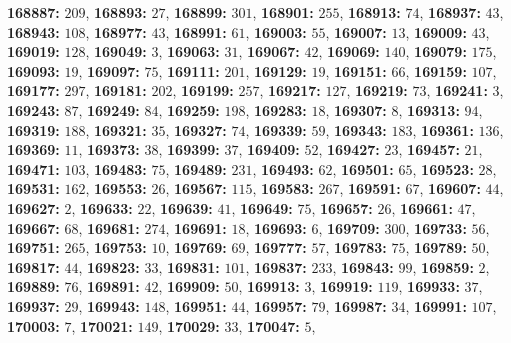 \textsf{\bfseries 168887:} $209$, \textsf{\bfseries 168893:} $27$, \textsf{\bfseries 168899:} $301$, \textsf{\bfseries 168901:} $255$, \textsf{\bfseries 168913:} $74$, \textsf{\bfseries 168937:} $43$, \textsf{\bfseries 168943:} $108$, \textsf{\bfseries 168977:} $43$, \textsf{\bfseries 168991:} $61$, \textsf{\bfseries 169003:} $55$, \textsf{\bfseries 169007:} $13$, \textsf{\bfseries 169009:} $43$, \textsf{\bfseries 169019:} $128$, \textsf{\bfseries 169049:} $3$, \textsf{\bfseries 169063:} $31$, \textsf{\bfseries 169067:} $42$, \textsf{\bfseries 169069:} $140$, \textsf{\bfseries 169079:} $175$, \textsf{\bfseries 169093:} $19$, \textsf{\bfseries 169097:} $75$, \textsf{\bfseries 169111:} $201$, \textsf{\bfseries 169129:} $19$, \textsf{\bfseries 169151:} $66$, \textsf{\bfseries 169159:} $107$, \textsf{\bfseries 169177:} $297$, \textsf{\bfseries 169181:} $202$, \textsf{\bfseries 169199:} $257$, \textsf{\bfseries 169217:} $127$, \textsf{\bfseries 169219:} $73$, \textsf{\bfseries 169241:} $3$, \textsf{\bfseries 169243:} $87$, \textsf{\bfseries 169249:} $84$, \textsf{\bfseries 169259:} $198$, \textsf{\bfseries 169283:} $18$, \textsf{\bfseries 169307:} $8$, \textsf{\bfseries 169313:} $94$, \textsf{\bfseries 169319:} $188$, \textsf{\bfseries 169321:} $35$, \textsf{\bfseries 169327:} $74$, \textsf{\bfseries 169339:} $59$, \textsf{\bfseries 169343:} $183$, \textsf{\bfseries 169361:} $136$, \textsf{\bfseries 169369:} $11$, \textsf{\bfseries 169373:} $38$, \textsf{\bfseries 169399:} $37$, \textsf{\bfseries 169409:} $52$, \textsf{\bfseries 169427:} $23$, \textsf{\bfseries 169457:} $21$, \textsf{\bfseries 169471:} $103$, \textsf{\bfseries 169483:} $75$, \textsf{\bfseries 169489:} $231$, \textsf{\bfseries 169493:} $62$, \textsf{\bfseries 169501:} $65$, \textsf{\bfseries 169523:} $28$, \textsf{\bfseries 169531:} $162$, \textsf{\bfseries 169553:} $26$, \textsf{\bfseries 169567:} $115$, \textsf{\bfseries 169583:} $267$, \textsf{\bfseries 169591:} $67$, \textsf{\bfseries 169607:} $44$, \textsf{\bfseries 169627:} $2$, \textsf{\bfseries 169633:} $22$, \textsf{\bfseries 169639:} $41$, \textsf{\bfseries 169649:} $75$, \textsf{\bfseries 169657:} $26$, \textsf{\bfseries 169661:} $47$, \textsf{\bfseries 169667:} $68$, \textsf{\bfseries 169681:} $274$, \textsf{\bfseries 169691:} $18$, \textsf{\bfseries 169693:} $6$, \textsf{\bfseries 169709:} $300$, \textsf{\bfseries 169733:} $56$, \textsf{\bfseries 169751:} $265$, \textsf{\bfseries 169753:} $10$, \textsf{\bfseries 169769:} $69$, \textsf{\bfseries 169777:} $57$, \textsf{\bfseries 169783:} $75$, \textsf{\bfseries 169789:} $50$, \textsf{\bfseries 169817:} $44$, \textsf{\bfseries 169823:} $33$, \textsf{\bfseries 169831:} $101$, \textsf{\bfseries 169837:} $233$, \textsf{\bfseries 169843:} $99$, \textsf{\bfseries 169859:} $2$, \textsf{\bfseries 169889:} $76$, \textsf{\bfseries 169891:} $42$, \textsf{\bfseries 169909:} $50$, \textsf{\bfseries 169913:} $3$, \textsf{\bfseries 169919:} $119$, \textsf{\bfseries 169933:} $37$, \textsf{\bfseries 169937:} $29$, \textsf{\bfseries 169943:} $148$, \textsf{\bfseries 169951:} $44$, \textsf{\bfseries 169957:} $79$, \textsf{\bfseries 169987:} $34$, \textsf{\bfseries 169991:} $107$, \textsf{\bfseries 170003:} $7$, \textsf{\bfseries 170021:} $149$, \textsf{\bfseries 170029:} $33$, \textsf{\bfseries 170047:} $5$, 
